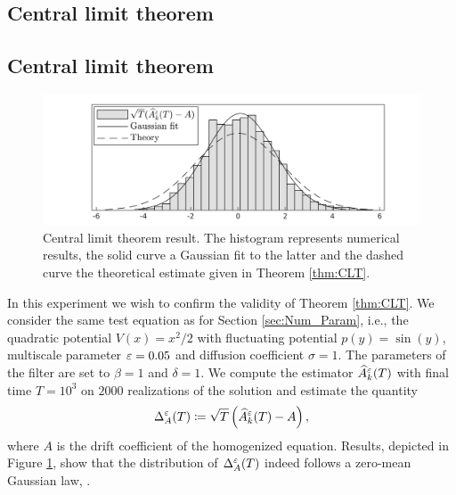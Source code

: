\documentclass[10pt]{article}
\begin{document}
\subsection{Central limit theorem}




\subsection{Central limit theorem}
\begin{figure}[t]
	\centering
	\includegraphics[]{../Figures/CLT}
	\caption{Central limit theorem result. The histogram represents numerical results, the solid curve a Gaussian fit to the latter and the dashed curve the theoretical estimate given in Theorem \ref{thm:CLT}.}
	\label{fig:CLT}
\end{figure}

In this experiment we wish to confirm the validity of Theorem \ref{thm:CLT}. We consider the same test equation as for Section \ref{sec:Num_Param}, i.e., the quadratic potential $V(x) = x^2/2$ with fluctuating potential $p(y) = \sin(y)$, multiscale parameter $\varepsilon = 0.05$ and diffusion coefficient $\sigma = 1$. The parameters of the filter are set to $\beta = 1$ and $\delta = 1$. We compute the estimator $\widehat A^\varepsilon_k(T)$ with final time $T = 10^3$ on $2000$ realizations of the solution and estimate the quantity 
\begin{equation}	
\Delta_A^\varepsilon(T) \coloneqq \sqrt{T}\left(\widehat A^\varepsilon_k(T) - A\right),	
\end{equation}
where $A$ is the drift coefficient of the homogenized equation. Results, depicted in Figure \ref{fig:CLT}, show that the distribution of $\Delta_A^\varepsilon(T)$ indeed follows a zero-mean Gaussian law, .
\end{document}

